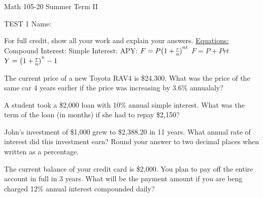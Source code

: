 \documentclass[11pt,epsfig]{article}
\begin{document}
Math 105-20 Summer Term II 

TEST 1 \hspace{1.9in} {Name:} {\underline {\hspace{3.5in}}}
\vspace{2pc}

For full credit, show all your work and explain your answers.
\newline
\newline
\underline{Equations:}
\newline
Compound Interest: \hspace{2.5cm}  Simple Interest:   \hspace{2.5cm} APY:
\newline
$F=P\big{(1+\frac{r}{n})}^{nt}$ 
\hspace{3.5cm} $F=P+Prt$
\hspace{3.0cm} $Y=\big{(1+\frac{r}{n})}^{n}-1$

\vspace{2pc}

\begin{problem}{25}
The current price of a new Toyota RAV4 is \$24,300. What was the price of the same car 4 years earlier if the price was increasing by 3.6\% annualaly? 
\vfill
\end{problem}

\begin{problem}{25}
A student took a \$2,000 loan with 10\% annual simple interest. What was the term of the loan (in months) if she had to repay \$2,150?
\vfill
\end{problem}

\newpage

\begin{problem}{25}
John's investment of \$1,000 grew to \$2,388.20 in 11 years. What annual rate of interest did this investment earn? Round your answer to two decimal places when written as a percentage.

\vfill
\end{problem}


\begin{problem}{25}
The current balance of your credit card is \$2,000. You plan to pay off the entire account in full in 3 years. What will be the payment amount if you are beng charged 12\% annual interest compounded daily?

\vfill
\end{problem}
\end{document}
